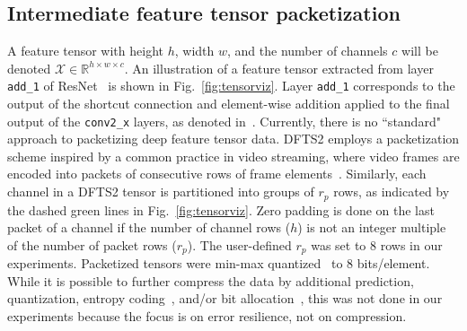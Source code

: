 \documentclass[conference,letterpaper]{IEEEtran}
\begin{document}
\subsection{Intermediate feature tensor packetization} \label{subsec:description:pkt}
A feature tensor with height $h$, width $w$, and the number of channels $c$ will be denoted $\mathcal{X} \in \mathbb{R}^{h \times w \times c}$. An illustration of a feature tensor extracted from layer \texttt{add\_1} of ResNet~\cite{ResNet} is shown in Fig.~\ref{fig:tensorviz}.
Layer \texttt{add\_1} corresponds to the output of the shortcut connection and element-wise addition applied to the final output of the \texttt{conv2\_x} layers, as denoted in~\cite[Table~1]{ResNet}. Currently, there is no ``standard" approach to packetizing deep feature tensor data. DFTS2 employs a packetization scheme inspired by a common practice in video streaming, where video frames are encoded into packets of consecutive rows of frame elements~\cite{video2002}.
Similarly, each channel in a DFTS2 tensor is partitioned into groups of $r_p$ rows, as indicated by the dashed
green lines in Fig.~\ref{fig:tensorviz}. Zero padding is done on the last packet of a channel if the number of channel rows ($h$) is not an integer multiple of the number of packet rows ($r_p$). The user-defined $r_p$ was set to 8 rows in our experiments. Packetized tensors were min-max quantized~\cite{choi2018deep} to 8 bits/element. While it is possible to further compress the data by additional prediction, quantization, entropy coding~\cite{Hyomin_MMSP_2018,Saeed_ICIP_2019,BaF_ICASSP_2021,lightweight_ICME_2020}, and/or bit allocation~\cite{bit_alloc_TIP_2021}, this was not done in our experiments because the focus is on error resilience, not on compression.

\end{document}
